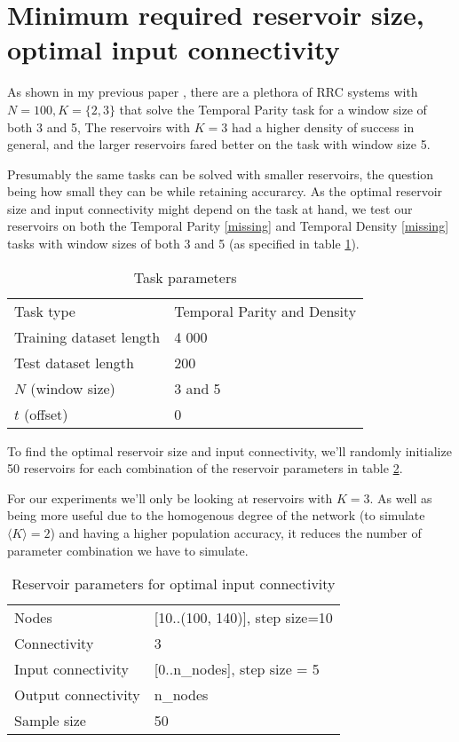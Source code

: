 \section{Minimum required reservoir size, optimal input connectivity}

As shown in my previous paper \cite{MyPreviousPaper},
there are a plethora of RRC systems with $N=100, K=\{2, 3\}$ that solve the Temporal Parity task for a window size of both 3 and 5,
The reservoirs with $K=3$ had a higher density of success in general,
and the larger reservoirs fared better on the task with window size 5.

Presumably the same tasks can be solved with smaller reservoirs,
the question being how small they can be while retaining accurarcy.
As the optimal reservoir size and input connectivity might depend on the task at hand,
we test our reservoirs on both the Temporal Parity \ref{missing} and Temporal Density \ref{missing}
tasks with window sizes of both 3 and 5 (as specified in table \ref{tab:tasks}).

\begin{table}[ht]
  \centering
  \caption{Task parameters}
  \label{tab:tasks}
  \begin{tabular}{ll}
    Task type               & Temporal Parity and Density \\
    Training dataset length & 4 000                       \\
    Test dataset length     & 200                         \\
    $N$ (window size)       & 3 and 5                     \\
    $t$ (offset)            & 0
  \end{tabular}
\end{table}

To find the optimal reservoir size and input connectivity,
we'll randomly initialize 50 reservoirs for each combination of the reservoir parameters in table \ref{tab:ic-reservoir-parameters}.

For our experiments we'll only be looking at reservoirs with $K=3$.
As well as being more useful due to the homogenous degree of the network (to simulate $\langle K \rangle = 2 $) and
having a higher population accuracy, it reduces the number of parameter combination we have to simulate.

\begin{table}[ht]
    \centering
    \caption{Reservoir parameters for optimal input connectivity}
    \label{tab:ic-reservoir-parameters}
    \begin{tabular}{ll}
        Nodes               & [10..(100, 140)], step size=10 \\
        Connectivity        & 3                              \\
        Input connectivity  & [0..n\_nodes], step size = 5   \\
		Output connectivity & n\_nodes                       \\
        Sample size         & 50
    \end{tabular}
\end{table}

